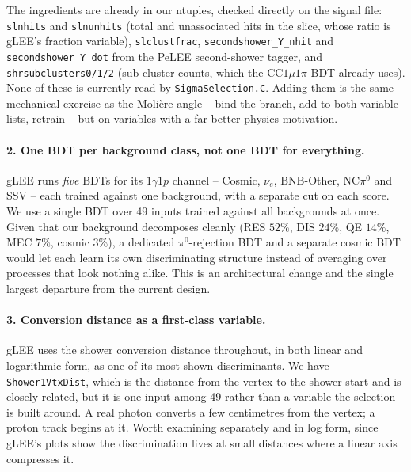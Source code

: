 \documentclass[11pt,a4paper]{article}
\begin{document}
The ingredients are already in our ntuples, checked directly on the signal file:
\texttt{slnhits} and \texttt{slnunhits} (total and unassociated hits in the slice,
whose ratio is gLEE's fraction variable), \texttt{slclustfrac},
\texttt{secondshower\_Y\_nhit} and \texttt{secondshower\_Y\_dot} from the PeLEE
second-shower tagger, and \texttt{shrsubclusters0/1/2} (sub-cluster counts, which the
CC$1\mu1\pi$ BDT already uses). None of these is currently read by
\texttt{SigmaSelection.C}. Adding them is the same mechanical exercise as the
Moli\`ere angle -- bind the branch, add to both variable lists, retrain -- but on
variables with a far better physics motivation.

\paragraph{2. One BDT per background class, not one BDT for everything.} gLEE runs
\emph{five} BDTs for its $1\gamma1p$ channel -- Cosmic, $\nu_e$, BNB-Other, NC$\pi^0$
and SSV -- each trained against one background, with a separate cut on each score.
We use a single BDT over 49 inputs trained against all backgrounds at once. Given
that our background decomposes cleanly (RES $52\%$, DIS $24\%$, QE $14\%$, MEC
$7\%$, cosmic $3\%$), a dedicated $\pi^0$-rejection BDT and a separate cosmic BDT
would let each learn its own discriminating structure instead of averaging over
processes that look nothing alike. This is an architectural change and the single
largest departure from the current design.

\paragraph{3. Conversion distance as a first-class variable.} gLEE uses the shower
conversion distance throughout, in both linear and logarithmic form, as one of its
most-shown discriminants. We have \texttt{Shower1VtxDist}, which is the distance
from the vertex to the shower start and is closely related, but it is one input among
49 rather than a variable the selection is built around. A real photon converts a few
centimetres from the vertex; a proton track begins at it. Worth examining separately
and in log form, since gLEE's plots show the discrimination lives at small distances
where a linear axis compresses it.
\end{document}
